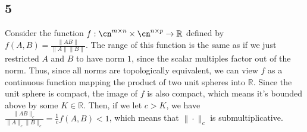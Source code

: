 \documentclass{article}
\newcommand{\rn}{\mathbb{R}}
\begin{document}
\subsection*{5}
Consider the function $f:\cn^{m\times n}\times\cn^{n\times p}\to\rn$ defined by $f(A,B)=\frac{\|AB\|}{\|A\|\|B\|}$. The range of this function is the same as if we just restricted $A$ and $B$ to have norm $1$, since the scalar multiples factor out of the norm. Thus, since all norms are topologically equivalent, we can view $f$ as a continuous function mapping the product of two unit spheres into $\rn$. Since the unit sphere is compact, the image of $f$ is also compact, which means it's bounded above by some $K\in\rn$. Then, if we let $c>K$, we have $\frac{\|AB\|_c}{\|A\|_c\|B\|_c}=\frac{1}{c}f(A,B)<1$, which means that $\|\cdot\|_c$ is submultiplicative.
\end{document}
